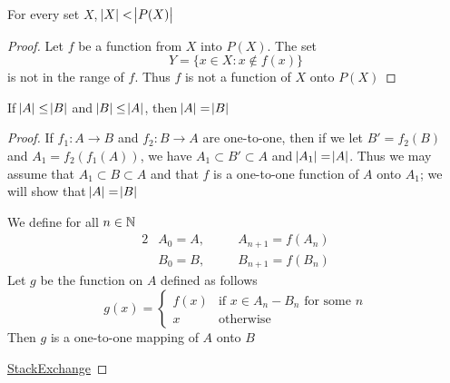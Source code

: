 \documentclass[11pt]{article}
\begin{document}
\begin{theorem}[Cantor]
For every set \(X\), \(\abs{X}<\abs{P(X)}\)
\end{theorem}
\begin{proof}
Let \(f\) be a function from \(X\) into \(P(X)\). The set 
\begin{equation*}
Y=\{x\in X:x\not\in f(x)\}
\end{equation*}
is not in the range of \(f\). Thus \(f\) is not a function of \(X\) onto \(P(X)\)
\end{proof}
\begin{theorem}
If \(\abs{A}\le\abs{B}\) and \(\abs{B}\le\abs{A}\), then \(\abs{A}=\abs{B}\)
\end{theorem}
\begin{proof}
If \(f_1:A\to B\) and \(f_2:B\to A\) are one-to-one, then if we let \(B'=f_2(B)\)
and \(A_1=f_2(f_1(A))\), we have \(A_1\subset B'\subset A\) and
\(\abs{A_1}=\abs{A}\). Thus we may assume that \(A_1\subset B\subset A\) and
that \(f\) is a one-to-one function of \(A\) onto \(A_1\); we will show that
\(\abs{A}=\abs{B}\)

We define for all \(n\in\mathbb{N}\)
\begin{alignat*}{2}
&A_0=A,\quad&&A_{n+1}=f(A_n)\\
&B_0=B,&&B_{n+1}=f(B_n)
\end{alignat*}
Let \(g\) be the function on \(A\) defined as follows 
\begin{equation*}
g(x)=
\begin{cases}
f(x)&\text{if }x\in A_n-B_n\text{ for some }n\\
x&\text{otherwise}
\end{cases}
\end{equation*}
Then \(g\) is a one-to-one mapping of \(A\) onto \(B\)

\href{https://math.stackexchange.com/questions/936467/problem-applying-the-cantor-bernstein-theorem-proof-technique-to-two-open-interv}{StackExchange}
\end{proof}
\end{document}

